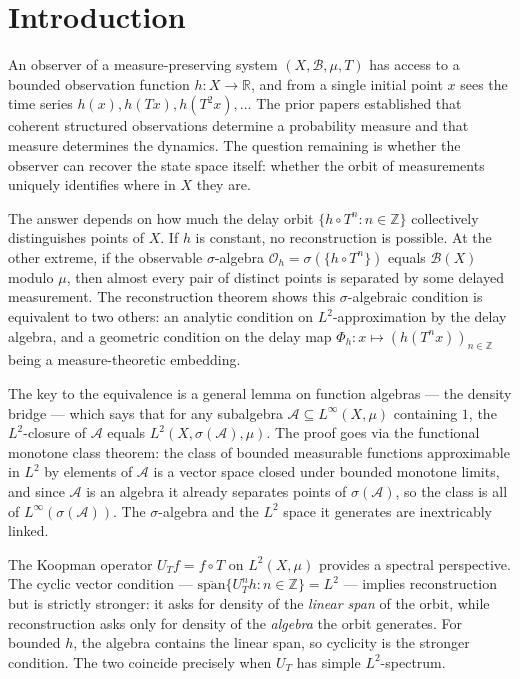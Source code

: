 \section{Introduction}
\label{sec:intro}

An observer of a measure-preserving system $(X, \mathcal{B}, \mu, T)$ has
access to a bounded observation function $h : X \to \mathbb{R}$, and from a
single initial point $x$ sees the time series $h(x), h(Tx), h(T^2x), \ldots$
The prior papers established that coherent structured observations determine a
probability measure and that measure determines the dynamics.  The question
remaining is whether the observer can recover the state space itself: whether
the orbit of measurements uniquely identifies where in $X$ they are.

The answer depends on how much the delay orbit
$\{h \circ T^n : n \in \mathbb{Z}\}$ collectively distinguishes points of $X$.
If $h$ is constant, no reconstruction is possible.  At the other extreme, if
the observable $\sigma$-algebra $\mathcal{O}_h = \sigma(\{h \circ T^n\})$
equals $\mathcal{B}(X)$ modulo $\mu$, then almost every pair of distinct points
is separated by some delayed measurement.  The reconstruction theorem shows
this $\sigma$-algebraic condition is equivalent to two others: an analytic
condition on $L^2$-approximation by the delay algebra, and a geometric
condition on the delay map $\Phi_h : x \mapsto (h(T^n x))_{n \in \mathbb{Z}}$
being a measure-theoretic embedding.

The key to the equivalence is a general lemma on function algebras — the
density bridge — which says that for any subalgebra
$\mathcal{A} \subseteq L^\infty(X, \mu)$ containing $1$, the $L^2$-closure of
$\mathcal{A}$ equals $L^2(X, \sigma(\mathcal{A}), \mu)$.  The proof goes via
the functional monotone class theorem: the class of bounded measurable functions
approximable in $L^2$ by elements of $\mathcal{A}$ is a vector space closed
under bounded monotone limits, and since $\mathcal{A}$ is an algebra it already
separates points of $\sigma(\mathcal{A})$, so the class is all of
$L^\infty(\sigma(\mathcal{A}))$.  The $\sigma$-algebra and the $L^2$ space it
generates are inextricably linked.

The Koopman operator $U_T f = f \circ T$ on $L^2(X, \mu)$ provides a spectral
perspective.  The cyclic vector condition —
$\overline{\mathrm{span}}\{U_T^n h : n \in \mathbb{Z}\} = L^2$ — implies
reconstruction but is strictly stronger: it asks for density of the
\emph{linear span} of the orbit, while reconstruction asks only for density of
the \emph{algebra} the orbit generates.  For bounded $h$, the algebra contains
the linear span, so cyclicity is the stronger condition.  The two coincide
precisely when $U_T$ has simple $L^2$-spectrum.

